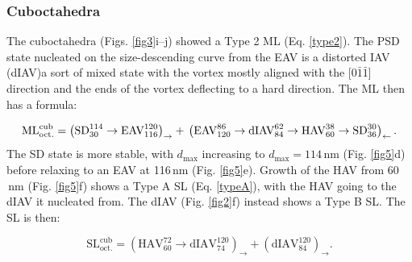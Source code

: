 \documentclass[review,authoryear]{elsarticle}
\newcommand{\dmax}{d_\text{max}}
\newcommand{\nm}{\,\text{nm}}
\begin{document}
\subsubsection{Cuboctahedra}
The cuboctahedra (Figs. \ref{fig3}i--j) showed a Type 2 ML (Eq. \ref{type2}). The PSD state nucleated on the size-descending curve from the EAV is a distorted IAV (dIAV){\textemdash}a sort of mixed state with the vortex mostly aligned with the [0$\bar{1}$$\bar{1}$] direction and the ends of the vortex deflecting to a hard direction. The ML then has a formula:
{\par\nobreak\noindent}
\begin{equation}
\text{ML}_{\text{oct.}}^{\text{cub}}=\left(\text{SD}_{30}^{114}\rightarrow\text{EAV}_{116}^{120}\right)_{\rightarrow} + \\
 \left(\text{EAV}_{120}^{86}\rightarrow\text{dIAV}_{84}^{62}\rightarrow\text{HAV}_{60}^{38}\rightarrow\text{SD}_{36}^{30}\right)_{\leftarrow}.
\end{equation}
The SD state is more stable, with $\dmax$ increasing to $\dmax=114\,\text{nm}$ (Fig. \ref{fig5}d) before relaxing to an EAV at 116$\nm$ (Fig. \ref{fig5}e). Growth of the HAV from 60$\nm$ (Fig. \ref{fig5}f) shows a Type A SL (Eq. \ref{typeA}), with the HAV going to the dIAV it nucleated from. The dIAV (Fig. \ref{fig2}f) instead shows a Type B SL. The SL is then:
{\par\nobreak\noindent}
\begin{equation}
\text{SL}_{\text{oct.}}^{\text{cub}}=\left(\text{HAV}_{60}^{72}\rightarrow\text{dIAV}_{74}^{120}\right)_{\rightarrow} + \left(\text{dIAV}_{84}^{120}\right)_{\rightarrow}.
\end{equation}
\par
\end{document}
